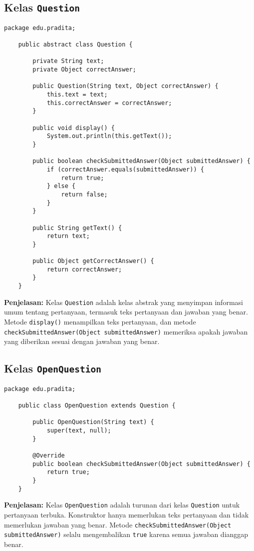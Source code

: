 \subsection{Kelas \texttt{Question}}

\begin{lstlisting}[style=JavaStyle]
	package edu.pradita;
	
	public abstract class Question {
		
		private String text;
		private Object correctAnswer;
		
		public Question(String text, Object correctAnswer) {
			this.text = text;
			this.correctAnswer = correctAnswer;
		}
		
		public void display() {
			System.out.println(this.getText());
		}
		
		public boolean checkSubmittedAnswer(Object submittedAnswer) {
			if (correctAnswer.equals(submittedAnswer)) {
				return true;
			} else {
				return false;
			}
		}
		
		public String getText() {
			return text;
		}
		
		public Object getCorrectAnswer() {
			return correctAnswer;
		}
	}
\end{lstlisting}

\textbf{Penjelasan:} Kelas \texttt{Question} adalah kelas abstrak yang menyimpan informasi umum tentang pertanyaan, termasuk teks pertanyaan dan jawaban yang benar. Metode \texttt{display()} menampilkan teks pertanyaan, dan metode \texttt{checkSubmittedAnswer(Object submittedAnswer)} memeriksa apakah jawaban yang diberikan sesuai dengan jawaban yang benar.

\subsection{Kelas \texttt{OpenQuestion}}

\begin{lstlisting}[style=JavaStyle]
	package edu.pradita;
	
	public class OpenQuestion extends Question {
		
		public OpenQuestion(String text) {
			super(text, null);
		}
		
		@Override
		public boolean checkSubmittedAnswer(Object submittedAnswer) {
			return true;
		}
	}
\end{lstlisting}

\textbf{Penjelasan:} Kelas \texttt{OpenQuestion} adalah turunan dari kelas \texttt{Question} untuk pertanyaan terbuka. Konstruktor hanya memerlukan teks pertanyaan dan tidak memerlukan jawaban yang benar. Metode \texttt{checkSubmittedAnswer(Object submittedAnswer)} selalu mengembalikan \texttt{true} karena semua jawaban dianggap benar.

